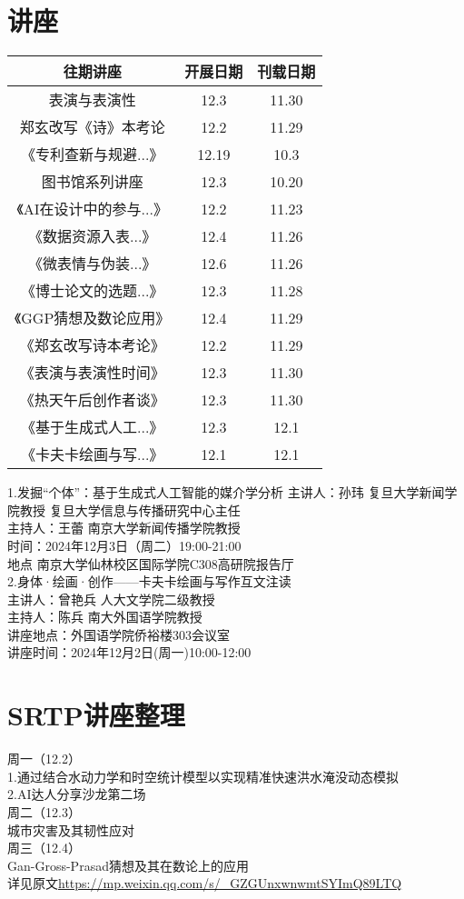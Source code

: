 \documentclass[letterpaper, 12pt]{article}
\begin{document}
\begin{multicols}{2}

\section{讲座}
\begin{tabular}{|c|c|c|}
    \hline
    往期讲座 & 开展日期 & 刊载日期\\
    \hline\hline
    表演与表演性 & 12.3 & 11.30\\
    郑玄改写《诗》本考论 & 12.2 & 11.29\\
    《专利查新与规避...》 & 12.19 & 10.3\\
    图书馆系列讲座 & 12.3 & 10.20\\
    《AI在设计中的参与...》 & 12.2 & 11.23\\
    《数据资源入表...》 & 12.4 & 11.26\\
    《微表情与伪装...》 & 12.6 & 11.26\\
    《博士论文的选题...》 & 12.3 & 11.28\\
    《GGP猜想及数论应用》 & 12.4 & 11.29\\
    《郑玄改写诗本考论》 & 12.2 & 11.29\\
    《表演与表演性时间》 & 12.3 & 11.30\\
    《热天午后创作者谈》 & 12.3 & 11.30\\
    《基于生成式人工...》 & 12.3 & 12.1\\
    《卡夫卡绘画与写...》 & 12.1 & 12.1\\
    \hline
\end{tabular}
1.发掘“个体”：基于生成式人工智能的媒介学分析
主讲人：孙玮 复旦大学新闻学院教授 复旦大学信息与传播研究中心主任\\
主持人：王蕾 南京大学新闻传播学院教授\\
时间：2024年12月3日（周二）19:00-21:00\\
地点 南京大学仙林校区国际学院C308高研院报告厅\\
2.身体·绘画·创作——卡夫卡绘画与写作互文注读\\
主讲人：曾艳兵 人大文学院二级教授\\
主持人：陈兵 南大外国语学院教授\\
讲座地点：外国语学院侨裕楼303会议室\\
讲座时间：2024年12月2日(周一)10:00-12:00\\
\section{SRTP讲座整理}
周一（12.2）\\
1.通过结合水动力学和时空统计模型以实现精准快速洪水淹没动态模拟\\
2.AI达人分享沙龙第二场\\
周二（12.3）\\
城市灾害及其韧性应对\\
周三（12.4）\\
Gan-Gross-Prasad猜想及其在数论上的应用\\
详见原文\url{https://mp.weixin.qq.com/s/_GZGUnxwnwmtSYImQ89LTQ}


\end{multicols}
\end{document}

